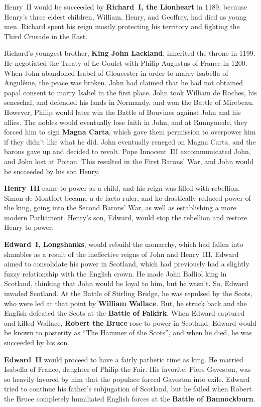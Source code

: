 Henry~II would be succeeded by \textbf{Richard~I, the Lionheart} in 1189,
because Henry's three eldest children, William, Henry, and Geoffrey, had died as young men.
Richard spent his reign mostly protecting his territory and fighting the Third Crusade in the East.

Richard's youngest brother, \textbf{King John Lackland}, inherited the throne in 1199.
He negotiated the Treaty of Le Goulet with Philip Augustus of France in 1200.
When John abandoned Isabel of Gloucester in order to marry Isabella of Angul\^eme, the peace was broken.
John had claimed that he had not obtained papal consent to marry Isabel in the first place.
John took William de Roches, his seneschal, and defended his lands in Normandy, and won the Battle of Mirebeau.
However, Philip would later win the Battle of Bouvines against John and his allies.
The nobles would eventually lose faith in John, and at Runnymede,
they forced him to sign \textbf{Magna Carta},
which gave them permission to overpower him if they didn't like what he did.
John eventually reneged on Magna Carta, and the barons gave up and decided to revolt.
Pope Innocent~III excommunicated John, and John lost at Poitou.
This resulted in the First Barons' War, and John would be succeeded by his son Henry.

\textbf{Henry~III} came to power as a child, and his reign was filled with rebellion.
Simon de Montfort became a de facto ruler, and he drastically reduced power of the king,
going into the Second Barons' War, as well as establishing a more modern Parliament.
Henry's son, Edward, would stop the rebellion and restore Henry to power.

\textbf{Edward~I, Longshanks}, would rebuild the monarchy,
which had fallen into shambles as a result of the ineffective reigns of John and Henry~III\@.
Edward aimed to consolidate his power in Scotland,
which had previously had a slightly fuzzy relationship with the English crown.
He made John Balliol king in Scotland, thinking that John would be loyal to him, but he wasn't.
So, Edward invaded Scotland.
At the Battle of Stirling Bridge, he was repulsed by the Scots,
who were led at that point by \textbf{William Wallace}.
But, he struck back and the English defeated the Scots at the \textbf{Battle of Falkirk}.
When Edward captured and killed Wallace, \textbf{Robert the Bruce} rose to power in Scotland.
Edward would be known to posterity as ``The Hammer of the Scots'',
and when he died, he was succeeded by his son.

\textbf{Edward~II} would proceed to have a fairly pathetic time as king.
He married Isabella of France, daughter of Philip the Fair.
His favorite, Piers Gaveston, was so heavily favored by him that the populace forced Gaveston into exile.
Edward tried to continue his father's subjugation of Scotland, but he failed
when Robert the Bruce completely humiliated English forces at the \textbf{Battle of Bannockburn}.

